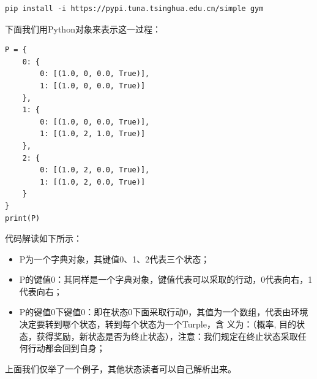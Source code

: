 \begin{lstlisting}
pip install -i https://pypi.tuna.tsinghua.edu.cn/simple gym
\end{lstlisting}
下面我们用Python对象来表示这一过程：
\begin{lstlisting}
P = {
    0: {
        0: [(1.0, 0, 0.0, True)],
        1: [(1.0, 0, 0.0, True)]
    },
    1: {
        0: [(1.0, 0, 0.0, True)],
        1: [(1.0, 2, 1.0, True)]
    },
    2: {
        0: [(1.0, 2, 0.0, True)],
        1: [(1.0, 2, 0.0, True)]
    }
}
print(P)
\end{lstlisting}
代码解读如下所示：
\begin{itemize}
    \item P为一个字典对象，其键值0、1、2代表三个状态；
    \item P的键值0：其同样是一个字典对象，键值代表可以采取的行动，0代表向右，1代表向右；
    \item P的键值0下键值0：即在状态0下面采取行动0，其值为一个数组，代表由环境决定要转到哪个状态，转到每个状态为一个Turple，含
义为：（概率, 目的状态，获得奖励，新状态是否为终止状态），注意：我们规定在终止状态采取任何行动都会回到自身；
\end{itemize}
上面我们仅举了一个例子，其他状态读者可以自己解析出来。
